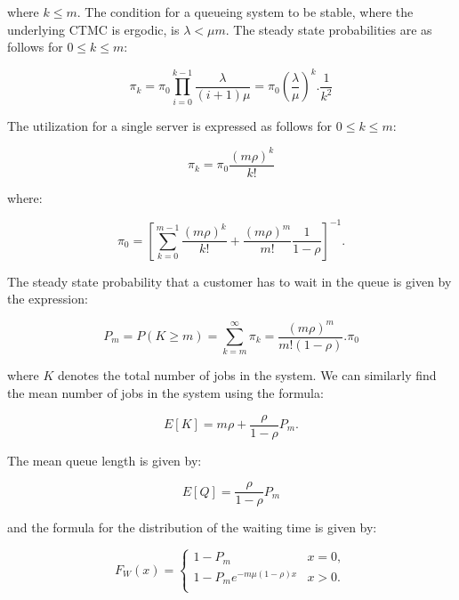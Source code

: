 \documentclass[a4paper,11pt,titlepage]{article}
\begin{document}
where $k \leq m$. The condition for a queueing system to be stable, where the underlying CTMC is ergodic, is $\lambda < \mu m$. The steady state probabilities are as follows for $0 \leq k \leq m$: 

\begin{equation}
    \pi_k = \pi_0 \prod_{i = 0}^{k-1} \frac{\lambda}{(i+1)\mu} = \pi_0 \left(\frac{\lambda}{\mu} \right) ^k . \frac{1}{k^2}
\end{equation}

The utilization for a single server is expressed as follows for $0 \leq k \leq m$: 

\begin{equation}
    \pi_k = \pi_0 \frac{(m \rho)^k}{k!}
\end{equation}

where:

\begin{equation}
    \pi_0 = \left[\sum_{k=0}^{m-1} \frac{(m \rho)^k}{k!} + \frac{(m \rho)^m}{m!} \frac{1}{1-\rho} \right ]^{-1}.
\end{equation}

The steady state probability that a customer has to wait in the queue is given by the expression: 

\begin{equation}
    P_m = P(K \geq m) = \sum_{k=m}^{\infty} \pi_k = \frac{(m \rho)^m}{m!(1-\rho)}.\pi_0
\end{equation}

where $K$ denotes the total number of jobs in the system. We can similarly find the mean number of jobs in the system using the formula: 

\begin{equation}
    E[K] = m \rho + \frac{\rho}{1-\rho} P_m.
\end{equation}

The mean queue length is given by:

\begin{equation}
    E[Q] = \frac{\rho}{1-\rho}  P_m
\end{equation}

and the formula for the distribution of the waiting time is given by: 

\begin{equation}
    F_W(x) =
    \begin{cases}
    1-P_m & x = 0, \\
    1 - P_m e^{-m \mu (1-\rho) x} & x > 0. \\
    \end{cases}
\end{equation}
\end{document}
